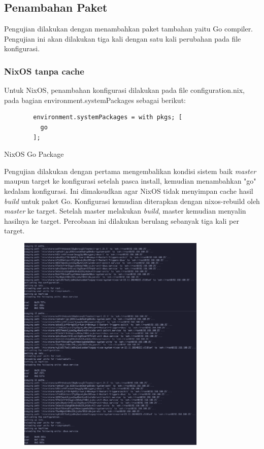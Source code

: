 \documentclass[10pt,twoside]{report}
\newenvironment{code}{\captionsetup{type=listing}}{\vspace{3mm}}
\begin{document}
\begin{adjustwidth}{20pt}{}
	\subsection{Penambahan Paket}
	\begin{adjustwidth}{20pt}{}
		Pengujian dilakukan dengan menambahkan paket tambahan yaitu Go compiler.
		Pengujian ini akan dilakukan tiga kali dengan satu kali perubahan pada file
		konfigurasi.
	\end{adjustwidth}
	\subsubsection{NixOS tanpa cache}
	\begin{adjustwidth}{20pt}{}
		Untuk NixOS, penambahan konfigurasi dilakukan pada file configuration.nix, pada
		bagian environment.systemPackages sebagai berikut:
		\begin{code}
			\begin{verbatim}
        environment.systemPackages = with pkgs; [
          go
        ];
      \end{verbatim}
			\caption{NixOS Go Package}
		\end{code}
		Pengujian dilakukan dengan pertama mengembalikan kondisi sistem baik
		\textit{master} maupun target ke konfigurasi setelah pasca install,
		kemudian menambahkan "go" kedalam konfigurasi. Ini dimaksudkan agar NixOS tidak
		menyimpan cache hasil \textit{build} untuk paket Go. Konfigurasi kemudian
		diterapkan dengan nixos-rebuild oleh \textit{master} ke target. Setelah
		master melakukan \textit{build}, master kemudian menyalin hasilnya ke
		target. Percobaan ini dilakukan berulang sebanyak tiga kali per target.
	\end{adjustwidth}
	\begin{figure}[H]
		\begin{center}
			\includegraphics[width=0.8\textwidth]{images/nix-target/nix-go-25-com.png}

\end{center}
\end{figure}
\end{adjustwidth}
\end{document}
